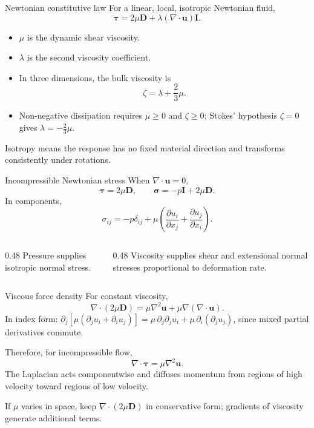 \documentclass[aspectratio=169,11pt]{beamer}
\newcommand{\uvec}{\bm{u}}
\newcommand{\stress}{\bm{\sigma}}
\newcommand{\taustress}{\bm{\tau}}
\newcommand{\Dtensor}{\mathbf{D}}
\newcommand{\Identity}{\mathbf{I}}
\begin{document}
\begin{frame}{Newtonian constitutive law}
For a linear, local, isotropic Newtonian fluid,
\[
  \boxed{
  \taustress
  =2\mu\Dtensor
  +\lambda(\nabla\cdot\uvec)\Identity
  }.
\]
\begin{itemize}\itemsep6pt
  \item $\mu$ is the dynamic shear viscosity.
  \item $\lambda$ is the second viscosity coefficient.
  \item In three dimensions, the bulk viscosity is
  \[
    \zeta=\lambda+\frac{2}{3}\mu.
  \]
  \item Non-negative dissipation requires $\mu\ge0$ and $\zeta\ge0$; Stokes' hypothesis $\zeta=0$ gives $\lambda=-\tfrac23\mu$.
\end{itemize}
\begin{punchbox}
\small Isotropy means the response has no fixed material direction and transforms consistently under rotations.
\end{punchbox}
\end{frame}

\begin{frame}{Incompressible Newtonian stress}
When $\nabla\cdot\uvec=0$,
\[
  \boxed{\taustress=2\mu\Dtensor},
  \qquad
  \boxed{\stress=-p\Identity+2\mu\Dtensor}.
\]
In components,
\[
  \sigma_{ij}
  =-p\delta_{ij}
  +\mu\left(
  \frac{\partial u_i}{\partial x_j}
  +\frac{\partial u_j}{\partial x_i}
  \right).
\]

\begin{columns}[T,onlytextwidth]
\begin{column}{0.48\textwidth}
Pressure supplies isotropic normal stress.
\end{column}
\begin{column}{0.48\textwidth}
Viscosity supplies shear and extensional normal stresses proportional to deformation rate.
\end{column}
\end{columns}
\end{frame}

\begin{frame}{Viscous force density}
For constant viscosity,
\[
  \nabla\cdot(2\mu\Dtensor)
  =\mu\nabla^2\uvec
  +\mu\nabla(\nabla\cdot\uvec).
\]
{\small In index form: $\partial_j\!\left[\mu(\partial_ju_i+\partial_iu_j)\right]=\mu\,\partial_j\partial_ju_i+\mu\,\partial_i(\partial_ju_j)$, since mixed partial derivatives commute.}

Therefore, for incompressible flow,
\[
  \boxed{\nabla\cdot\taustress=\mu\nabla^2\uvec}.
\]
The Laplacian acts componentwise and diffuses momentum from regions of high velocity toward regions of low velocity.

\begin{punchbox}
\small If $\mu$ varies in space, keep $\nabla\cdot(2\mu\Dtensor)$ in conservative form; gradients of viscosity generate additional terms.
\end{punchbox}
\end{frame}
\end{document}

